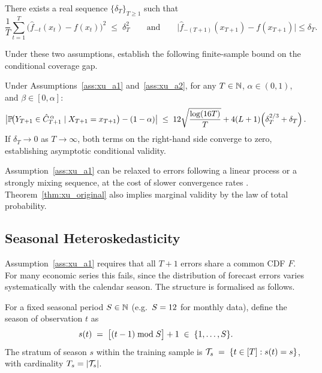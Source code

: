 \begin{assumption}
\label{ass:xu_a2}
There exists a real sequence $\{\delta_T\}_{T \geq 1}$ such that
\[
  \frac{1}{T}\sum_{t=1}^T \bigl(\hat{f}_{-t}(x_t) - f(x_t)\bigr)^2
  \;\leq\; \delta_T^2
  \qquad\text{and}\qquad
  \bigl|\hat{f}_{-(T+1)}(x_{T+1}) - f(x_{T+1})\bigr| \leq \delta_T.
\]
\end{assumption}

Under these two assumptions, \citet{xu2023conformal} establish the
following finite-sample bound on the conditional coverage gap.

\begin{theorem}
\label{thm:xu_original}
Under Assumptions~\ref{ass:xu_a1} and~\ref{ass:xu_a2}, for any
$T \in \mathbb{N}$, $\alpha \in (0,1)$, and $\beta \in [0,\alpha]$:
\[
  \bigl|
    \mathbb{P}\!\bigl(Y_{T+1} \in \hat{C}_{T+1}^{\,\alpha}
                 \mid X_{T+1} = x_{T+1}\bigr) - (1-\alpha)
  \bigr|
  \;\leq\;
  12\sqrt{\frac{\log(16T)}{T}}
  + 4(L+1)\!\left(\delta_T^{2/3} + \delta_T\right).
\]
If $\delta_T \to 0$ as $T \to \infty$, both terms on the right-hand
side converge to zero, establishing asymptotic conditional validity.
\end{theorem}

\begin{remark}
  Assumption~\ref{ass:xu_a1} can be relaxed to errors following a
  linear process or a strongly mixing sequence, at the cost of slower
  convergence rates \citep[Corollaries~1--2]{xu2023conformal}.
  Theorem~\ref{thm:xu_original} also implies marginal validity by
  the law of total probability.
\end{remark}

\subsection{Seasonal Heteroskedasticity}
\label{sec:model:seasonal}

Assumption~\ref{ass:xu_a1} requires that all $T+1$ errors share a
common CDF $F$.  For many economic series this fails, since the
distribution of forecast errors varies systematically with the
calendar season.  The structure is formalised as follows.

\begin{definition}
\label{def:season}
For a fixed seasonal period $S \in \mathbb{N}$ (e.g.\ $S = 12$ for
monthly data), define the season of observation $t$ as
\[
  s(t) \;=\; \bigl[(t-1) \bmod S\bigr] + 1 \;\in\; \{1,\ldots,S\}.
\]
The stratum of season $s$ within the training sample is
$\mathcal{T}_s \;=\; \{t \in [T] : s(t) = s\}$,
with cardinality $T_s = |\mathcal{T}_s|$.
\end{definition}

